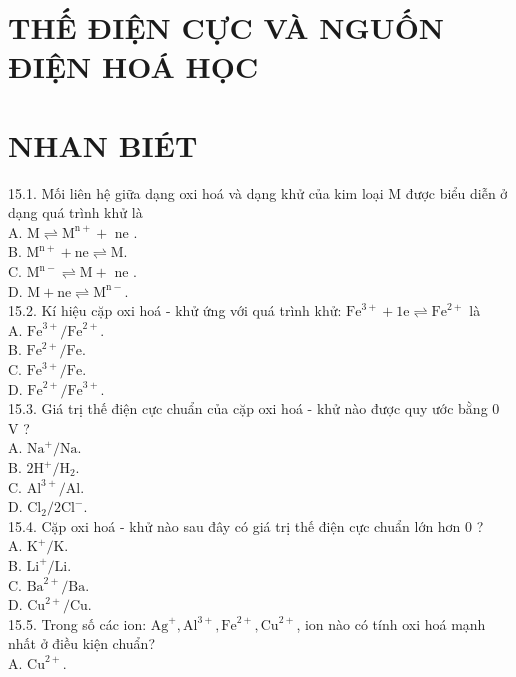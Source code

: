\documentclass[10pt]{article}
\begin{document}
\section*{THẾ ĐIỆN CỰC VÀ NGUỐN ĐIỆN HOÁ HỌC}
\section*{NHAN BIÉT}
15.1. Mối liên hệ giữa dạng oxi hoá và dạng khử của kim loại M được biểu diễn ở dạng quá trình khử là\\
A. $\mathrm{M} \rightleftharpoons \mathrm{M}^{\mathrm{n}+}+$ ne .\\
B. $\mathrm{M}^{\mathrm{n}+}+\mathrm{ne} \rightleftharpoons \mathrm{M}$.\\
C. $\mathrm{M}^{\mathrm{n}-} \rightleftharpoons \mathrm{M}+$ ne .\\
D. $\mathrm{M}+\mathrm{ne} \rightleftharpoons \mathrm{M}^{\mathrm{n}-}$.\\
15.2. Kí hiệu cặp oxi hoá - khử ứng với quá trình khử: $\mathrm{Fe}^{3+}+1 \mathrm{e} \rightleftharpoons \mathrm{Fe}^{2+}$ là\\
A. $\mathrm{Fe}^{3+} / \mathrm{Fe}^{2+}$.\\
B. $\mathrm{Fe}^{2+} / \mathrm{Fe}$.\\
C. $\mathrm{Fe}^{3+} / \mathrm{Fe}$.\\
D. $\mathrm{Fe}^{2+} / \mathrm{Fe}^{3+}$.\\
15.3. Giá trị thế điện cực chuẩn của cặp oxi hoá - khử nào được quy ước bằng 0 V ?\\
A. $\mathrm{Na}^{+} / \mathrm{Na}$.\\
B. $2 \mathrm{H}^{+} / \mathrm{H}_{2}$.\\
C. $\mathrm{Al}^{3+} / \mathrm{Al}$.\\
D. $\mathrm{Cl}_{2} / 2 \mathrm{Cl}^{-}$.\\
15.4. Cặp oxi hoá - khử nào sau đây có giá trị thế điện cực chuẩn lớn hơn 0 ?\\
A. $\mathrm{K}^{+} / \mathrm{K}$.\\
B. $\mathrm{Li}^{+} / \mathrm{Li}$.\\
C. $\mathrm{Ba}^{2+} / \mathrm{Ba}$.\\
D. $\mathrm{Cu}^{2+} / \mathrm{Cu}$.\\
15.5. Trong số các ion: $\mathrm{Ag}^{+}, \mathrm{Al}^{3+}, \mathrm{Fe}^{2+}, \mathrm{Cu}^{2+}$, ion nào có tính oxi hoá mạnh nhất ở điều kiện chuẩn?\\
A. $\mathrm{Cu}^{2+}$.\\
\end{document}
